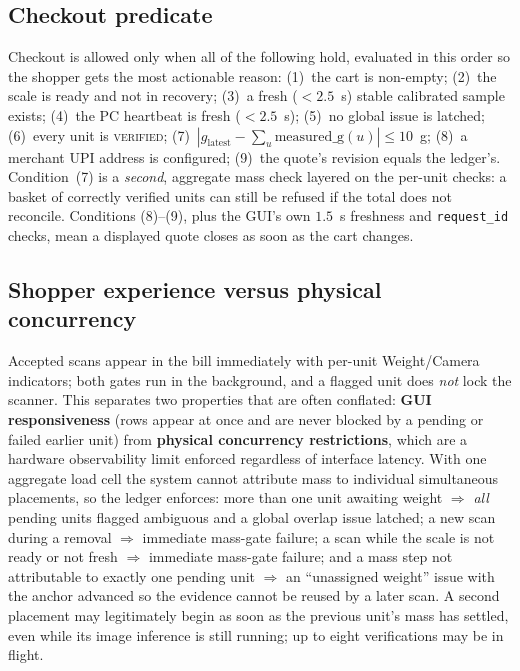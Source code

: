 \documentclass[conference]{IEEEtran}
\begin{document}
\subsection{Checkout predicate}
Checkout is allowed only when all of the following hold, evaluated in this order so the shopper gets
the most actionable reason: (1)~the cart is non-empty; (2)~the scale is ready and not in recovery;
(3)~a fresh ($<2.5$~s) stable calibrated sample exists; (4)~the PC heartbeat is fresh ($<2.5$~s);
(5)~no global issue is latched; (6)~every unit is \textsc{verified}; (7)~$|g_{\text{latest}} -
\sum_u \mathrm{measured\_g}(u)| \le 10$~g; (8)~a merchant UPI address is configured; (9)~the quote's
revision equals the ledger's. Condition~(7) is a \emph{second}, aggregate mass check layered on the
per-unit checks: a basket of correctly verified units can still be refused if the total does not
reconcile. Conditions (8)--(9), plus the GUI's own $1.5$~s freshness and \texttt{request\_id} checks,
mean a displayed quote closes as soon as the cart changes.

\subsection{Shopper experience versus physical concurrency}
Accepted scans appear in the bill immediately with per-unit Weight/Camera indicators; both gates run
in the background, and a flagged unit does \emph{not} lock the scanner. This separates two properties
that are often conflated: \textbf{GUI responsiveness} (rows appear at once and are never blocked by a
pending or failed earlier unit) from \textbf{physical concurrency restrictions}, which are a hardware
observability limit enforced regardless of interface latency. With one aggregate load cell the system
cannot attribute mass to individual simultaneous placements, so the ledger enforces: more than one
unit awaiting weight $\Rightarrow$ \emph{all} pending units flagged ambiguous and a global overlap
issue latched; a new scan during a removal $\Rightarrow$ immediate mass-gate failure; a scan while the
scale is not ready or not fresh $\Rightarrow$ immediate mass-gate failure; and a mass step not
attributable to exactly one pending unit $\Rightarrow$ an ``unassigned weight'' issue with the anchor
advanced so the evidence cannot be reused by a later scan. A second placement may legitimately begin
as soon as the previous unit's mass has settled, even while its image inference is still running; up
to eight verifications may be in flight.

\end{document}
